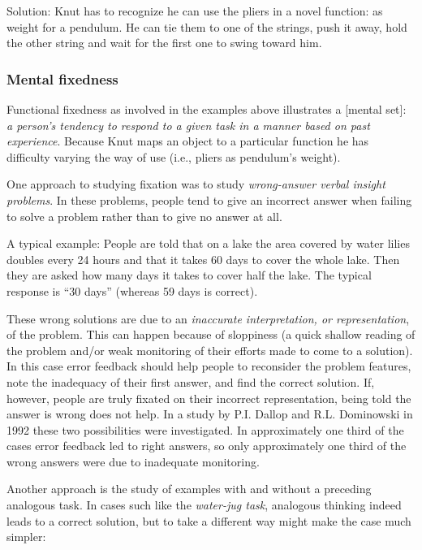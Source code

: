 \documentclass[
]{krantz}
\begin{document}
Solution: Knut has to recognize he can use the pliers in a novel function: as weight for a pendulum. He can tie them to one of the strings, push it away, hold the other string and wait for the first one to swing toward him.

\hypertarget{mental-fixedness}{%
\subsubsection*{Mental fixedness}\label{mental-fixedness}}


Functional fixedness as involved in the examples above illustrates a {[}mental set{]}: \emph{a person's tendency to respond to a given task in a manner based on past experience}. Because Knut maps an object to a particular function he has difficulty varying the way of use (i.e., pliers as pendulum's weight).

One approach to studying fixation was to study \emph{wrong-answer verbal insight problems}. In these problems, people tend to give an incorrect answer when failing to solve a problem rather than to give no answer at all.

A typical example: People are told that on a lake the area covered by water lilies doubles every 24 hours and that it takes 60 days to cover the whole lake. Then they are asked how many days it takes to cover half the lake. The typical response is ``30 days'' (whereas 59 days is correct).

These wrong solutions are due to an \emph{inaccurate interpretation, or representation}, of the problem. This can happen because of sloppiness (a quick shallow reading of the problem and/or weak monitoring of their efforts made to come to a solution). In this case error feedback should help people to reconsider the problem features, note the inadequacy of their first answer, and find the correct solution. If, however, people are truly fixated on their incorrect representation, being told the answer is wrong does not help. In a study by P.I. Dallop and R.L. Dominowski in 1992 these two possibilities were investigated. In approximately one third of the cases error feedback led to right answers, so only approximately one third of the wrong answers were due to inadequate monitoring.

Another approach is the study of examples with and without a preceding analogous task. In cases such like the \emph{water-jug task}, analogous thinking indeed leads to a correct solution, but to take a different way might make the case much simpler:
\end{document}
